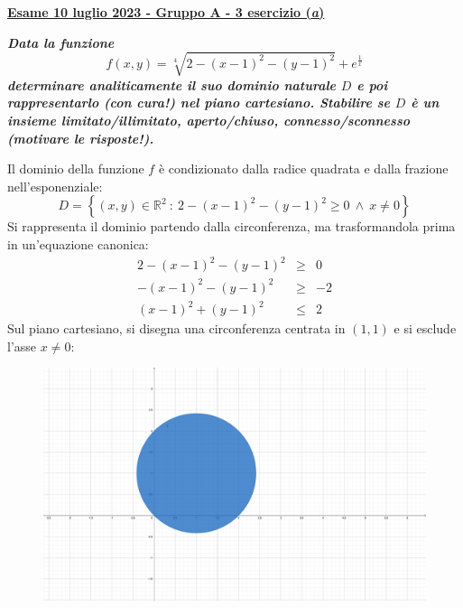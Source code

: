 \documentclass[a4paper]{article}
\newcommand{\definition}[1]{\textcolor{Red3}{\textbf{#1}}}
\newcommand{\example}[1]{\textcolor{Green4}{\textbf{#1}}}
\begin{document}
	\begin{flushleft}
		\label{exam: esame 10 luglio 2023 - Gruppo A - 3 esercizio (a)}
		\hypertarget{
			exam: esame 10 luglio 2023 - Gruppo A - 3 esercizio (a)
		}{
			\definition{\underline{Esame 10 luglio 2023 - Gruppo A - 3 esercizio (\emph{a})}}
		}
	\end{flushleft}
	\example{\emph{Data la funzione}
	\begin{equation*}
		f\left(x,y\right) = \sqrt[4]{2-\left(x-1\right)^{2}-\left(y-1\right)^{2}} + e^{\frac{1}{x}}
	\end{equation*}
	\emph{determinare analiticamente il suo dominio naturale $D$ e poi rappresentarlo (con cura!) nel piano cartesiano. Stabilire se $D$ è un insieme limitato/illimitato, aperto/chiuso, connesso/sconnesso (motivare le risposte!).}}\newline

	\noindent
	Il dominio della funzione $f$ è condizionato dalla radice quadrata e dalla frazione nell'esponenziale:
	\begin{equation*}
		D = \left\{\left(x,y\right) \in \mathbb{R}^{2} \: : \: 2-\left(x-1\right)^{2}-\left(y-1\right)^{2} \ge 0 \: \land \: x \ne 0\right\}
	\end{equation*}
	Si rappresenta il dominio partendo dalla circonferenza, ma trasformandola prima in un'equazione canonica:
	\begin{equation*}
		\begin{array}{rcl}
			2-\left(x-1\right)^{2}-\left(y-1\right)^{2} &\ge& 0 \\ [.3em]
			-\left(x-1\right)^{2}-\left(y-1\right)^{2} &\ge& -2 \\ [.3em]
			\left(x-1\right)^{2}+\left(y-1\right)^{2} &\le& 2
		\end{array}
	\end{equation*}
	Sul piano cartesiano, si disegna una circonferenza centrata in $\left(1,1\right)$ e si esclude l'asse $x\ne 0$:
	\begin{figure}[!htp]
		\centering
		\includegraphics[width=.7\textwidth]{img/exercise/2023-07-10-A-ex3(a).pdf}
	\end{figure}
\end{document}
